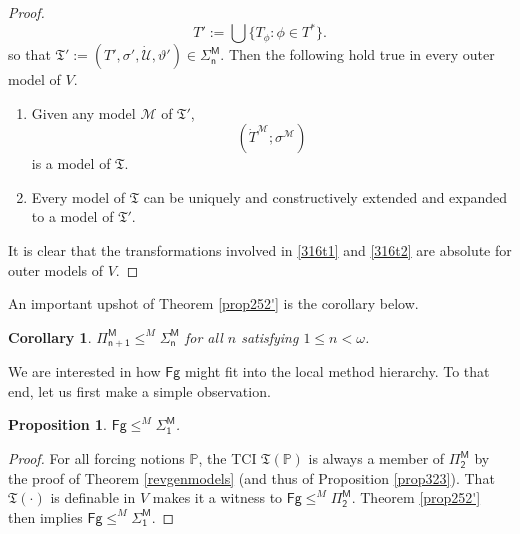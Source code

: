 \documentclass[12pt, twoside]{memoir}
\numberwithin{equation}{section}
\newtheorem{prop}[thm]{Proposition}
\newtheorem{cor}[thm]{Corollary}
\theoremstyle{definition}
\theoremstyle{remark}
\theoremstyle{definition}
\theoremstyle{definition}
\theoremstyle{definition}
\theoremstyle{remark}
\begin{document}
\begin{proof}
\begin{equation*}
    T' := \bigcup \{T_{\phi} : \phi \in T^*\} \text{.}
\end{equation*}
so that $\mathfrak{T}' := (T', \sigma', \dot{\mathcal{U}}, \vartheta') \in \mathsf{\Sigma^M_n}$. Then the following hold true in every outer model of $V$.
\begin{enumerate}[label=(T\arabic*)]
    \item\label{316t1} Given any model $\mathcal{M}$ of $\mathfrak{T}'$,
    \begin{equation*}
        (\dot{T}^{\mathcal{M}}; \sigma^{\mathcal{M}})
    \end{equation*} 
    is a model of $\mathfrak{T}$. 
    \item\label{316t2} Every model of $\mathfrak{T}$ can be uniquely and constructively extended and expanded to a model of $\mathfrak{T}'$.
\end{enumerate}
It is clear that the transformations involved in \ref{316t1} and \ref{316t2} are absolute for outer models of $V$.
\end{proof}

An important upshot of Theorem \ref{prop252'} is the corollary below.

\begin{cor}
$\mathsf{\Pi^M_{n+1}} \leq^M \mathsf{\Sigma^M_n}$ for all $n$ satisfying $1 \leq n < \omega$.
\end{cor}

We are interested in how $\mathsf{Fg}$ might fit into the local method hierarchy. To that end, let us first make a simple observation.

\begin{prop}\label{prop343}
$\mathsf{Fg} \leq^M \mathsf{\Sigma^M_1}$.
\end{prop}

\begin{proof}
For all forcing notions $\mathbb{P}$, the TCI $\mathfrak{T}(\mathbb{P})$ is always a member of $\mathsf{\Pi^M_2}$ by the proof of Theorem \ref{revgenmodels} (and thus of Proposition \ref{prop323}). That $\mathfrak{T}(\cdot)$ is definable in $V$ makes it a witness to $\mathsf{Fg} \leq^M \mathsf{\Pi^M_2}$. Theorem \ref{prop252'} then implies $\mathsf{Fg} \leq^M \mathsf{\Sigma^M_1}$.
\end{proof}
\end{document}
